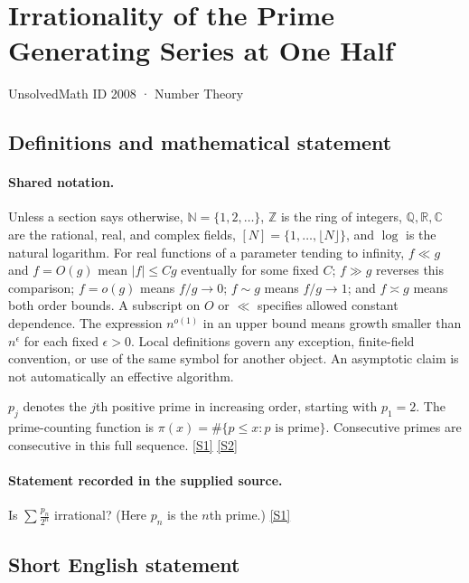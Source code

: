 \documentclass[11pt,a4paper]{article}
\newcommand{\N}{\mathbb{N}}
\newcommand{\Z}{\mathbb{Z}}
\newcommand{\Q}{\mathbb{Q}}
\newcommand{\R}{\mathbb{R}}
\newcommand{\C}{\mathbb{C}}
\newcommand{\sref}[2]{\hyperlink{source:#1:#2}{[S#2]}}
\begin{document}

\setcounter{section}{2007}

\section{Irrationality of the Prime Generating Series at One Half}\label{2008}

{\small\sffamily UnsolvedMath ID 2008 · Number Theory}

\subsection{Definitions and mathematical statement}

\paragraph{Shared notation.}Unless a section says otherwise, $\N=\{1,2,\ldots\}$,
$\Z$ is the ring of integers, $\Q,\R,\C$ are the rational, real, and complex
fields, $[N]=\{1,\ldots,\lfloor N\rfloor\}$, and $\log$ is the natural
logarithm. For real functions of a parameter tending to infinity,
$f\ll g$ and $f=O(g)$ mean $|f|\leq Cg$ eventually for some fixed $C$;
$f\gg g$ reverses this comparison; $f=o(g)$ means $f/g\to0$;
$f\sim g$ means $f/g\to1$; and $f\asymp g$ means both order bounds.
A subscript on $O$ or $\ll$ specifies allowed constant dependence.
The expression $n^{o(1)}$ in an upper bound means growth smaller than
$n^\epsilon$ for each fixed $\epsilon>0$. Local definitions govern any
exception, finite-field convention, or use of the same symbol for another
object. An asymptotic claim is not automatically an effective algorithm.



$p_j$ denotes the $j$th positive prime in increasing order, starting with $p_1=2$. The prime-counting function is $\pi(x)=\#\{p\leq x:p\text{ is prime}\}$. Consecutive primes are consecutive in this full sequence. \sref{2008}{1} \sref{2008}{2}

\paragraph{Statement recorded in the supplied source.}
Is $ \sum \frac{p_n}{2^n} $ irrational? (Here $p_n$ is the $n$th prime.) \sref{2008}{1}

\subsection{Short English statement}
\end{document}
